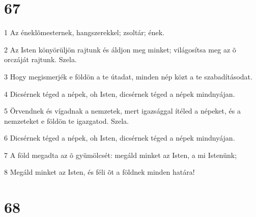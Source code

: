 \chapter{67}

\par 1 Az éneklõmesternek, hangszerekkel; zsoltár; ének.
\par 2 Az Isten könyörüljön rajtunk és áldjon meg minket; világosítsa meg az õ orczáját rajtunk. Szela.
\par 3 Hogy megismerjék e földön a te útadat, minden nép közt a te szabadításodat.
\par 4 Dicsérnek téged a népek, oh Isten, dicsérnek téged a népek mindnyájan.
\par 5 Örvendnek és vígadnak a nemzetek, mert igazsággal ítéled a népeket, és a nemzeteket e földön te igazgatod. Szela.
\par 6 Dicsérnek téged a népek, oh Isten, dicsérnek téged a népek mindnyájan.
\par 7 A föld megadta az õ gyümölcsét: megáld minket az Isten, a mi Istenünk;
\par 8 Megáld minket az Isten, és féli õt a földnek minden határa!

\chapter{68}

